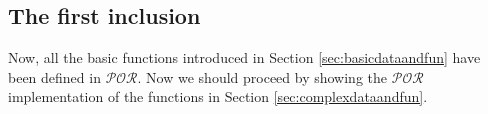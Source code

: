 \documentclass[10pt]{amsart}
\newcommand{\POR}{\mathcal{POR}}
\newcommand{\zero}{\mathtt{0}}
\newcommand{\msi}[1]{q_{#1}}
\newcommand{\sone}{\sigma}
\newcommand{\oone}{\omega}
\newcommand{\mcnfi}{\langle \epsilon, \msi0, \sone, \oone \rangle}
\newtheorem{lemma}{Lemma}
\newtheorem{remark}{Remark}
\begin{document}
\begin{comment}
\begin{remark}
The encoding of the initial state of a stream machine $\mcnfi$ is $\langle \langle\rangle_\oone, \overline \zero_\oone, tenc(\sone), \overline \zero_\oone\rangle_\oone$
\end{remark}

\begin{lemma}
There exists a $\POR$ function that, given the encoding $\mu$ of a stream machine $M$ and a configuration of such machine $c$, returns the next configuration reached by the machine:
\end{lemma}
\end{comment}
\subsection{The first inclusion}
Now, all the basic functions introduced in Section \ref{sec:basicdataandfun} have been defined in $\POR$. Now we should proceed by showing the $\POR$ implementation of the functions in Section \ref{sec:complexdataandfun}.
\end{document}
